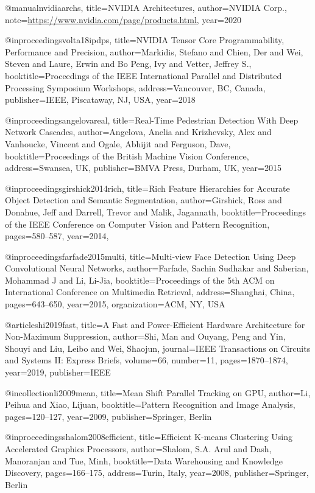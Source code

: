 @manual{nvidiaarchs,
  title={{{NVIDIA Architectures}}},
  author={{NVIDIA Corp.}},
  note={\url{https://www.nvidia.com/page/products.html}},
  year={2020}
}

@inproceedings{volta18ipdps,
  title={{{NVIDIA Tensor Core Programmability, Performance and Precision}}},
  author={Markidis, Stefano and Chien, Der and Wei, Steven and Laure, Erwin and Bo Peng, Ivy and Vetter, Jeffrey S.},
  booktitle={Proceedings of the IEEE International Parallel and Distributed Processing Symposium Workshops},
  address={Vancouver, BC, Canada},
  publisher={IEEE, Piscataway, NJ, USA},
  year={2018}
}

@inproceedings{angelovareal,
  title={{{Real-Time Pedestrian Detection With Deep Network Cascades}}},
  author={Angelova, Anelia and Krizhevsky, Alex and Vanhoucke, Vincent and Ogale, Abhijit and Ferguson, Dave},
  booktitle={Proceedings of the British Machine Vision Conference},
  address={Swansea, UK},
  publisher={BMVA Press, Durham, UK},
  year={2015}
}

@inproceedings{girshick2014rich,
  title={{{Rich Feature Hierarchies for Accurate Object Detection and Semantic Segmentation}}},
  author={Girshick, Ross and Donahue, Jeff and Darrell, Trevor and Malik, Jagannath},
  booktitle={Proceedings of the IEEE Conference on Computer Vision and Pattern Recognition},
  pages={580--587},
  year={2014},
}

@inproceedings{farfade2015multi,
  title={{{Multi-view Face Detection Using Deep Convolutional Neural Networks}}},
  author={Farfade, Sachin Sudhakar and Saberian, Mohammad J and Li, Li-Jia},
  booktitle={Proceedings of the 5th ACM on International Conference on Multimedia Retrieval},
  address={Shanghai, China},
  pages={643--650},
  year={2015},
  organization={ACM, NY, USA}
}

@article{shi2019fast,
  title={{{A Fast and Power-Efficient Hardware Architecture for Non-Maximum Suppression}}},
  author={Shi, Man and Ouyang, Peng and Yin, Shouyi and Liu, Leibo and Wei, Shaojun},
  journal={IEEE Transactions on Circuits and Systems II: Express Briefs},
  volume={66},
  number={11},
  pages={1870--1874},
  year={2019},
  publisher={IEEE}
}

@incollection{li2009mean,
  title={{{Mean Shift Parallel Tracking on GPU}}},
  author={Li, Peihua and Xiao, Lijuan},
  booktitle={Pattern Recognition and Image Analysis},
  pages={120--127},
  year={2009},
  publisher={Springer, Berlin}
}

@inproceedings{shalom2008efficient,
  title={{{Efficient K-means Clustering Using Accelerated Graphics Processors}}},
  author={Shalom, S.A. Arul and Dash, Manoranjan and Tue, Minh},
  booktitle={Data Warehousing and Knowledge Discovery},
  pages={166--175},
  address={Turin, Italy},
  year={2008},
  publisher={Springer, Berlin}
}

